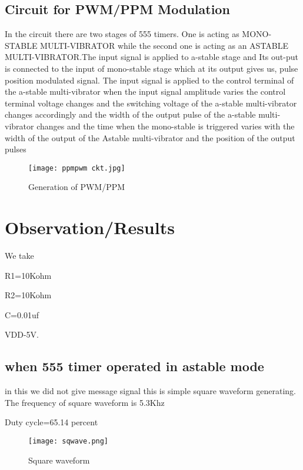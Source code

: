 \documentclass{article}
\begin{document}
\subsection{Circuit for PWM/PPM Modulation}
In the circuit there are two stages of 555 timers. One is acting as MONO-STABLE MULTI-VIBRATOR while the second one is acting as an ASTABLE MULTI-VIBRATOR.The input signal is applied to a-stable stage and Its out-put is connected to the input of mono-stable stage which at its output gives us, pulse position modulated signal. The input signal is applied to the control terminal of the a-stable multi-vibrator when the input signal amplitude varies the control terminal voltage changes and the switching voltage of the a-stable multi-vibrator changes accordingly and the width of the output pulse of the a-stable multi-vibrator changes and the time when the mono-stable is triggered varies with the width of the output of the Astable multi-vibrator and the position of the output pulses

\begin{figure*}[h]
	\centering
	\texttt{[image: ppmpwm ckt.jpg]}
	\caption{Generation of PWM/PPM}
	\label{FBD}
\end{figure*}

















\section{Observation/Results}
We take \par R1=10Kohm \par R2=10Kohm \par C=0.01uf \par VDD-5V.

\subsection{when 555 timer operated in astable mode}
in this we did not give message signal this is simple square waveform generating.
The frequency of square waveform is 5.3Khz \par
Duty cycle=65.14 percent \par

\begin{figure*}[h]
	\centering
	\texttt{[image: sqwave.png]}
	\caption{Square waveform }
	\label{FBD}
\end{figure*}
\end{document}
